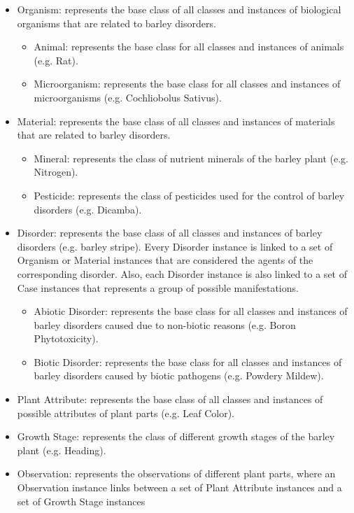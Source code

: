 \documentclass{frontiersSCNS} %
\begin{document}
\begin{itemize}
\item Organism: represents the base class of all classes and instances of biological organisms that
are related to barley disorders.
	\begin{itemize}
	\item Animal: represents the base class for all classes and instances of animals (e.g. Rat).
	\item Microorganism: represents the base class for all classes and instances of microorganisms (e.g. Cochliobolus Sativus).
	\end{itemize}
\item Material: represents the base class of all classes and instances of materials that are related to
barley disorders.
	\begin{itemize}
	\item Mineral: represents the class of nutrient minerals of the barley plant (e.g. Nitrogen).
	\item Pesticide: represents the class of pesticides used for the control of barley disorders (e.g. Dicamba).
	\end{itemize}
\item Disorder: represents the base class of all classes and instances of barley disorders (e.g.
barley stripe). Every Disorder instance is linked to a set of Organism or Material instances
that are considered the agents of the corresponding disorder. Also, each Disorder instance is
also linked to a set of Case instances that represents a group of possible manifestations.
	\begin{itemize}
	\item Abiotic Disorder: represents the base class for all classes and instances of barley disorders caused due to non-biotic reasons (e.g. Boron Phytotoxicity).
	\item Biotic Disorder: represents the base class for all classes and instances of barley disorders caused by biotic pathogens (e.g. Powdery Mildew).
	\end{itemize}
\item Plant Attribute: represents the base class of all classes and instances of possible attributes of
plant parts (e.g. Leaf Color).
\item Growth Stage: represents the class of different growth stages of the barley plant (e.g.
Heading).
\item Observation: represents the observations of different plant parts, where an Observation
instance links between a set of Plant Attribute instances and a set of Growth Stage instances

\end{itemize}
\end{document}
